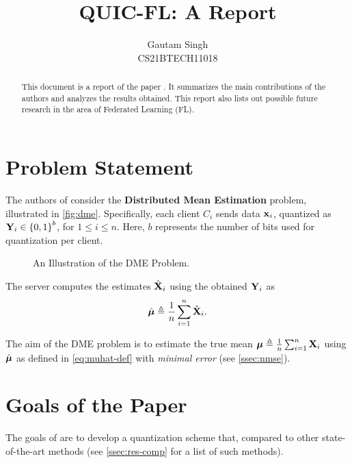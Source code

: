 \documentclass[journal,12pt,twocolumn]{IEEEtran}
\begin{document}
\vspace{3cm}
\title{QUIC-FL: A Report}
\author{Gautam Singh\\CS21BTECH11018}
\maketitle
\tableofcontents
\bigskip

\begin{abstract}
    This document is a report of the paper \cite{basat2023quicfl}. It 
    summarizes the main contributions of the authors and analyzes the results
    obtained. This report also lists out possible future research in the area
    of Federated Learning (FL).
\end{abstract}

\section{Problem Statement}
\label{sec:ps}
The authors of \cite{basat2023quicfl} consider the \textbf{Distributed Mean 
Estimation} problem, illustrated in \autoref{fig:dme}. Specifically, each 
client \(C_i\) sends data \(\boldsymbol{\mathbf{x}}_i\), quantized as \(\boldsymbol{\mathbf{Y}}_i\in
\left\{0,1\right\}^b\), for \(1 \le i \le n\). Here, \(b\) represents the number
of bits used for quantization per client.

\begin{figure}[!ht]
    
    \caption{An Illustration of the DME Problem.}
    \label{fig:dme}
\end{figure}

The server computes the estimates \(\hat{\boldsymbol{\mathbf{X}}}_i\) using the obtained 
\(\boldsymbol{\mathbf{Y}}_i\) as
\begin{equation}
    \hat{\boldsymbol{\mathbf{\mu}}} \triangleq \frac{1}{n}\sum_{i=1}^n\hat{\boldsymbol{\mathbf{X}}}_i.
    \label{eq:muhat-def}
\end{equation}

The aim of the DME problem is to estimate the true mean \(\boldsymbol{\mathbf{\mu}} \triangleq
\frac{1}{n}\sum_{i=1}^n\boldsymbol{\mathbf{X}}_i\) using \(\hat{\boldsymbol{\mathbf{\mu}}}\) as defined in
\eqref{eq:muhat-def} with \emph{minimal error} (see \autoref{ssec:nmse}).

\section{Goals of the Paper}
\label{sec:goals}
The goals of \cite{basat2023quicfl} are to develop a quantization scheme that,
compared to other state-of-the-art methods (see \autoref{ssec:res-comp} for a 
list of such methods).
\end{document}
